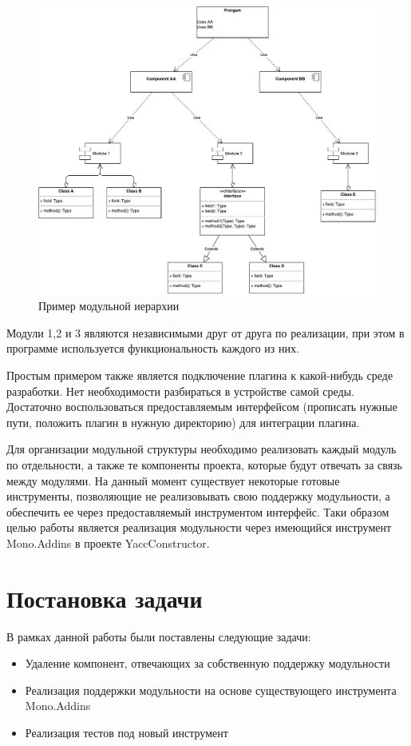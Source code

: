\begin{figure}[h!]
\begin{center}
\includegraphics[width=\linewidth]{Orlov/module_example}
\caption{Пример модульной иерархии}
\label{fig:module_example} 
\end{center}
\end{figure}

Модули 1,2 и 3 являются независимыми друг от друга по реализации, при этом в программе используется функциональность каждого из них.

Простым примером также является подключение плагина к какой-нибудь среде разработки. Нет необходимости разбираться в устройстве самой среды. Достаточно воспользоваться предоставляемым интерфейсом (прописать нужные пути, положить плагин в нужную директорию) для интеграции плагина.

Для организации модульной структуры необходимо реализовать каждый модуль по отдельности, а также те компоненты проекта, которые будут отвечать за связь между модулями. На данный момент существует некоторые готовые инструменты, позволяющие не реализовывать свою поддержку модульности, а обеспечить ее через предоставляемый инструментом интерфейс.
Таки образом целью работы является реализация модульности через имеющийся инструмент Mono.Addins в проекте YaccConstructor.

\section{Постановка задачи}
В рамках данной работы были поставлены следующие задачи:
\begin{itemize}
\item Удаление компонент, отвечающих за собственную поддержку модульности
\item Реализация поддержки модульности на основе существующего инструмента Mono.Addins
\item Реализация тестов под новый инструмент
\end{itemize}

